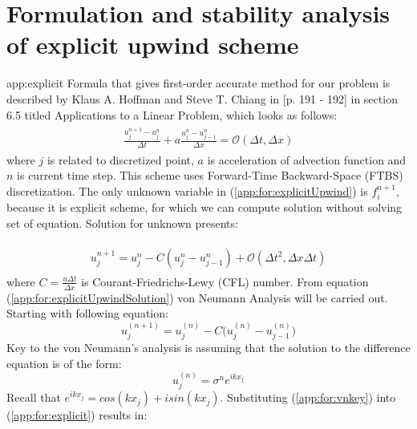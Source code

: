 \section{Formulation and stability analysis of explicit upwind scheme}{app:explicit}
	Formula that gives first-order accurate method for our problem is described by Klaus A. Hoffman and Steve T. Chiang in \cite{bib:hoffman}[p. 191 - 192] in section 6.5 titled Applications to a Linear Problem, which looks as follows:
		\begin{align}
			\label{app:for:explicitUpwind}
			\begin{split}
				\frac{u_j^{n+1} - u_j^n}{\Delta t} + a\frac{u_j^n - u_{j-1}^n}{\Delta x} = \mathcal{O}(\Delta t, \Delta x)
			\end{split}
		\end{align}
	where $j$ is related to discretized point, $a$ is acceleration of advection function and $n$ is current time step. This scheme uses Forward-Time Backward-Space (FTBS) discretization.
	The only unknown variable in (\ref{app:for:explicitUpwind}) is $f_i^{n+1}$, because it is explicit scheme, for which we can compute solution without solving set of equation. Solution for unknown presents:
	
		\begin{align}
			\label{app:for:explicitUpwindSolution}
			\begin{split}
				u_j^{n+1} = u_j^n - C(u_j^n - u_{j-1}^n) + \mathcal{O}(\Delta t^2, \Delta x \Delta t)
			\end{split}			
		\end{align}
	where $C=\frac{u\Delta t}{\Delta x}$ is Courant-Friedrichs-Lewy (CFL) number.	
	From equation (\ref{app:for:explicitUpwindSolution}) von Neumann Analysis will be carried out. Starting with following equation:
	\begin{equation}
		\label{app:for:explicit}
		u_j^{(n+1)} = u_j^{(n)} - C\Big(u_j^{(n)} - u_{j-1}^{(n)}\Big)
	\end{equation}	
	Key to the von Neumann's analysis is assuming that the solution to the difference equation is of the form:
	\begin{equation}
		\label{app:for:vnkey}
		u_j^{(n)} = \sigma^ne^{ikx_j}
	\end{equation}	
	Recall that $e^{ikx_j} = cos(kx_j) + isin(kx_j)$. Substituting (\ref{app:for:vnkey}) into (\ref{app:for:explicit}) results in:
	
